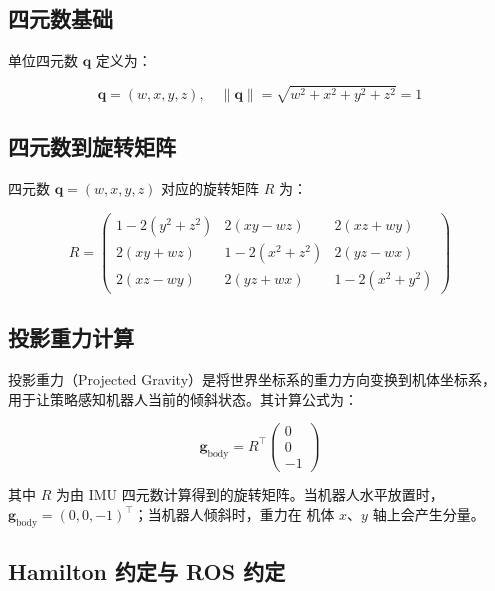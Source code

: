 \documentclass[a4paper,11pt,openany]{book}
\begin{document}
\subsection{四元数基础}

单位四元数 $\mathbf{q}$ 定义为：

\begin{equation}
\mathbf{q} = (w, x, y, z), \quad \|\mathbf{q}\| = \sqrt{w^2 + x^2 + y^2 + z^2} = 1
\end{equation}

\subsection{四元数到旋转矩阵}

四元数 $\mathbf{q} = (w, x, y, z)$ 对应的旋转矩阵 $R$ 为：

\begin{equation}
R = \begin{pmatrix}
1 - 2(y^2 + z^2) & 2(xy - wz) & 2(xz + wy) \\
2(xy + wz) & 1 - 2(x^2 + z^2) & 2(yz - wx) \\
2(xz - wy) & 2(yz + wx) & 1 - 2(x^2 + y^2)
\end{pmatrix}
\end{equation}

\subsection{投影重力计算}

投影重力（Projected Gravity）是将世界坐标系的重力方向变换到机体坐标系，
用于让策略感知机器人当前的倾斜状态。其计算公式为：

\begin{equation}
\label{eq:projected-gravity}
\mathbf{g}_{\mathrm{body}} = R^\top \begin{pmatrix} 0 \\ 0 \\ -1 \end{pmatrix}
\end{equation}

其中 $R$ 为由 IMU 四元数计算得到的旋转矩阵。当机器人水平放置时，
$\mathbf{g}_{\mathrm{body}} = (0, 0, -1)^\top$；当机器人倾斜时，重力在
机体 $x$、$y$ 轴上会产生分量。

\subsection{Hamilton 约定与 ROS 约定}
\end{document}
